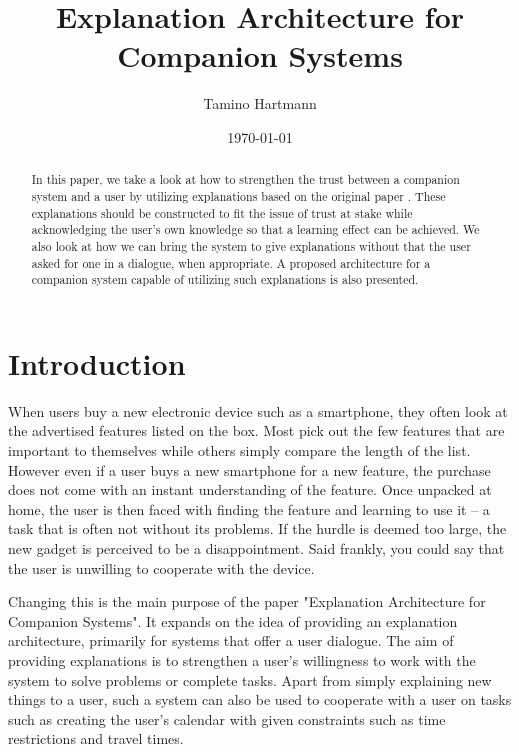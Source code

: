 \documentclass[a4paper]{article}
\begin{document}
\large

\title{Explanation Architecture for Companion Systems}
\author{Tamino Hartmann}
\date{\today}

\maketitle

\begin{abstract}
\normalsize
In this paper, we take a look at how to strengthen the trust between a companion system and a user by utilizing explanations based on the original paper \cite{origin}. These explanations should be constructed to fit the issue of trust at stake while acknowledging the user's own knowledge so that a learning effect can be achieved. We also look at how we can bring the system to give explanations without that the user asked for one in a dialogue, when appropriate. A proposed architecture for a companion system capable of utilizing such explanations is also presented.
\end{abstract}

\newpage

\section{Introduction}

When users buy a new electronic device such as a smartphone, they often look at the advertised features listed on the box. Most pick out the few features that are important to themselves while others simply compare the length of the list. However even if a user buys a new smartphone for a new feature, the purchase does not come with an instant understanding of the feature. Once unpacked at home, the user is then faced with finding the feature and learning to use it – a task that is often not without its problems. If the hurdle is deemed too large, the new gadget is perceived to be a disappointment. Said frankly, you could say that the user is unwilling to cooperate with the device.

Changing this is the main purpose of the paper "Explanation Architecture for Companion Systems"\cite{origin}. It expands on the idea of providing an explanation architecture, primarily for systems that offer a user dialogue. The aim of providing explanations is to strengthen a user's willingness to work with the system to solve problems or complete tasks. Apart from simply explaining new things to a user, such a system can also be used to cooperate with a user on tasks such as creating the user's calendar with given constraints such as time restrictions and travel times.
\end{document}

